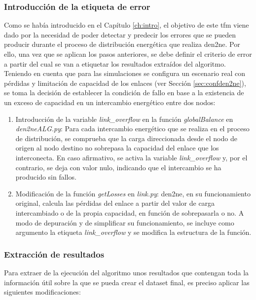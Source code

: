 \subsubsection{Introducción de la etiqueta de error}
\label{sec:etierror}
Como se había introducido en el Capítulo \ref{ch:intro}, el objetivo de este \gls{tfm} viene dado por la necesidad de poder detectar y predecir los errores que se pueden producir durante el proceso de distribución energética que realiza \gls{den2ne}. Por ello, una vez que se aplican los pasos anteriores, se debe definir el criterio de error a partir del cual se van a etiquetar los resultados extraídos del algoritmo. Teniendo en cuenta que para las simulaciones se configura un escenario real con pérdidas y limitación de capacidad de los enlaces (ver Sección \ref{sec:confden2ne}), se toma la decisión de establecer la condición de fallo en base a la existencia de un exceso de capacidad en un intercambio energético entre dos nodos:

\begin{enumerate}
    \item Introducción de la variable \textit{link\_overflow} en la función \textit{globalBalance} en \textit{den2neALG.py}: Para cada intercambio energético que se realiza en el proceso de distribución, se comprueba que la carga direccionada desde el nodo de origen al nodo destino no sobrepasa la capacidad del enlace que los interconecta. En caso afirmativo, se activa la variable \textit{link\_overflow} y, por el contrario, se deja con valor nulo, indicando que el intercambio se ha producido sin fallos. 
    \item Modificación de la función \textit{getLosses} en \textit{link.py}: \gls{den2ne}, en su funcionamiento original, calcula las pérdidas del enlace a partir del valor de carga intercambiado o de la propia capacidad, en función de sobrepasarla o no. A modo de depuración y de simplificar su funcionamiento, se incluye como argumento la etiqueta \textit{link\_overflow} y se modifica la estructura de la función.
\end{enumerate} 

\subsubsection{Extracción de resultados}
Para extraer de la ejecución del algoritmo unos resultados que contengan toda la información útil sobre la que se pueda crear el dataset final, es preciso aplicar las siguientes modificaciones:

